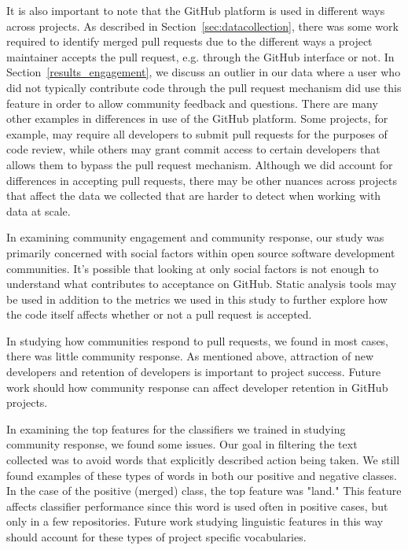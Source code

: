 \documentclass{iitthesis}
\begin{document}
It is also important to note that the GitHub platform is used in different ways
across projects. As described in Section~\ref{sec:datacollection}, there was
some work required to identify merged pull requests due to the different ways a
project maintainer accepts the pull request, e.g. through the GitHub interface
or not. In Section~\ref{results_engagement}, we discuss an outlier in our data
where a user who did not typically contribute code through the pull request
mechanism did use this feature in order to allow community feedback and
questions. There are many other examples in differences in use of the GitHub
platform. Some projects, for example, may require all developers to submit pull
requests for the purposes of code review, while others may grant commit access
to certain developers that allows them to bypass the pull request mechanism.
Although we did account for differences in accepting pull requests, there may be
other nuances across projects that affect the data we collected that are harder
to detect when working with data at scale.

 \label{sec:future_work}

In examining community engagement and community response, our study was
primarily concerned with social factors within open source software development
communities. It's possible that looking at only social factors is not enough to
understand what contributes to acceptance on GitHub. Static analysis tools may
be used in addition to the metrics we used in this study to further explore how
the code itself affects whether or not a pull request is accepted.

In studying how communities respond to pull requests, we found in most cases, there was little
community response. As mentioned above, attraction of new developers and
retention of developers is important to project success. Future work should how
community response can affect developer retention in GitHub projects.

In examining the top features for the classifiers we trained in studying
community response, we found some issues. Our goal in filtering the text
collected was to avoid words that explicitly described action being taken. We
still found examples of these types of words in both our positive and negative
classes. In the case of the positive (merged) class, the top feature was
"land." This feature affects classifier performance since this word is used
often in positive cases, but only in a few repositories. Future work studying
linguistic features in this way should account for these types of project
specific vocabularies.
\end{document}
